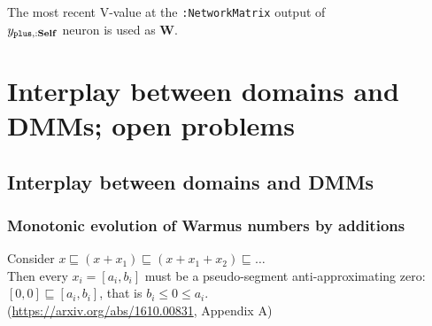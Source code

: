 \documentclass{beamer}
\newcommand{\msblue}[1]{{\color{myblue} #1}}
\begin{document}
\begin{frame}

The most recent V-value at the {\footnotesize\tt :NetworkMatrix} output of\\ $y_{{\tt plus}, {\bf :Self}}$ neuron is used as \msblue{\bf W}.


\end{frame}

\section{Interplay between domains and DMMs; open problems}

\subsection{Interplay between domains and DMMs}

\begin{frame}

  \frametitle{Monotonic evolution of Warmus numbers by additions}

Consider $x \sqsubseteq  (x+x_1) \sqsubseteq  (x+x_1+x_2) \sqsubseteq \dots $\\[2ex]

Then every $x_i = [a_i, b_i]$ must be a pseudo-segment anti-approximating zero:\\[2ex]

$[0,0] \sqsubseteq [a_i,b_i]$, that is $b_i \leq 0 \leq a_i$.\\[2ex]

(\url{https://arxiv.org/abs/1610.00831}, Appendix A)

\end{frame}
\end{document}
